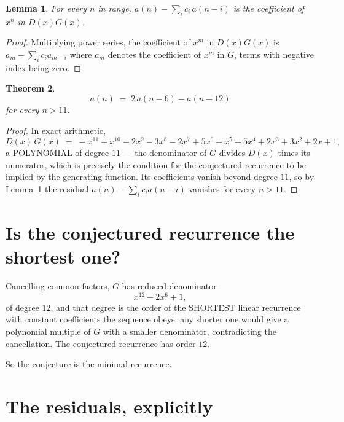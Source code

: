 \documentclass[11pt,a4paper]{article}
\theoremstyle{plain}
\newtheorem{theorem}{Theorem}
\newtheorem{lemma}[theorem]{Lemma}
\theoremstyle{definition}
\begin{document}
\begin{lemma}\label{lem:key}
For every $n$ in range, $a(n)-\sum_i c_i\,a(n-i)$ is the coefficient of $x^{n}$ in
$D(x)G(x)$.
\end{lemma}

\begin{proof}
Multiplying power series, the coefficient of $x^{m}$ in $D(x)G(x)$ is
$a_m-\sum_i c_i a_{m-i}$ where $a_m$ denotes the coefficient of $x^{m}$ in $G$, terms with
negative index being zero.
\end{proof}

\begin{theorem}
\[
a(n)\;=\;2\,a(n-6) - a(n-12)
\]
for every $n>11$.
\end{theorem}

\begin{proof}
In exact arithmetic,
\[
D(x)\,G(x)\;=\;- x^{11} + x^{10} - 2 x^{9} - 3 x^{8} - 2 x^{7} + 5 x^{6} + x^{5} + 5 x^{4} + 2 x^{3} + 3 x^{2} + 2 x + 1,
\]
a POLYNOMIAL of degree $11$ --- the denominator of $G$ divides $D(x)$ times its numerator,
which is precisely the condition for the conjectured recurrence to be implied by the
generating function. Its coefficients vanish beyond degree $11$, so by
Lemma~\ref{lem:key} the residual $a(n)-\sum_ic_ia(n-i)$ vanishes for every
$n>11$.
\end{proof}

\section{Is the conjectured recurrence the shortest one?}

Cancelling common factors, $G$ has reduced denominator
\[
x^{12} - 2 x^{6} + 1,
\]
of degree $12$, and that degree is the order of the SHORTEST linear recurrence with
constant coefficients the sequence obeys: any shorter one would give a polynomial multiple of
$G$ with a smaller denominator, contradicting the cancellation. The conjectured recurrence has
order $12$.

So the conjecture is the minimal recurrence.

\section{The residuals, explicitly}
\end{document}
